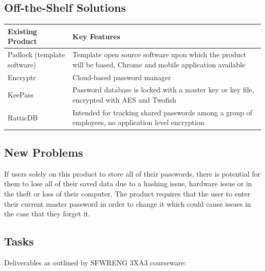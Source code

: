 \documentclass[12pt, titlepage]{article}
\begin{document}
\subsection{Off-the-Shelf Solutions}
\begin{table}
\begin{center}
\begin{tabular}{ | p{3cm} | p{10cm} | }
	\hline
	Existing Product & Key Features \\
	\hline
	Padlock (template software) & Template open source software upon which the product will be based, Chrome and mobile application available \\
	\hline
	Encryptr & Cloud-based password manager \\
	\hline
	KeePass & Password database is locked with a master key or key file, encrypted with AES and Twofish \\
	\hline
	RatticDB & Intended for tracking shared  passwords among a group of employees, no application level encryption \\
\hline
\end{tabular}
\end{center}
\end{table}


\subsection{New Problems}

If users solely on this product to store all of their passwords, there is potential for them to lose all of their saved data due to a hashing issue, hardware issue or in the theft or loss of their computer. The product requires that the user to enter their current master password in order to change it which could cause issues in the case that they forget it.

\subsection{Tasks}

Deliverables as outlined by SFWRENG 3XA3 courseware:
\end{document}
